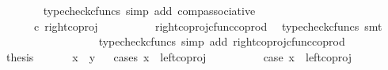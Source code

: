 \begin{isabellebody}
\ \ \ \ \ \ \isamarkupfalse%
\ {\isacharparenleft}{\kern0pt}typecheck{\isacharunderscore}{\kern0pt}cfuncs{\isacharcomma}{\kern0pt}\ simp\ add{\isacharcolon}{\kern0pt}\ comp{\isacharunderscore}{\kern0pt}associative{}{\isacharparenright}{\kern0pt}\isanewline
\ \ \ \ \isamarkupfalse%
\ \isamarkupfalse%
\ {\isachardoublequoteopen}{\isachardot}{\kern0pt}{\isachardot}{\kern0pt}{\isachardot}{\kern0pt}\ {\isacharequal}{\kern0pt}\ {\isasymlangle}{\isasymt}{\isacharcomma}{\kern0pt}{\isasymf}{\isasymrangle}\ {\isasymamalg}\ {\isasymlangle}{\isasymf}{\isacharcomma}{\kern0pt}{\isasymt}{\isasymrangle}\ {\isasymcirc}\isactrlsub c\ right{\isacharunderscore}{\kern0pt}coproj\ {\isasymone}\ {\isasymone}{\isachardoublequoteclose}\isanewline
\ \ \ \ \ \ \isamarkupfalse%
\ right{\isacharunderscore}{\kern0pt}coproj{\isacharunderscore}{\kern0pt}cfunc{\isacharunderscore}{\kern0pt}coprod\ \isamarkupfalse%
\ {\isacharparenleft}{\kern0pt}typecheck{\isacharunderscore}{\kern0pt}cfuncs{\isacharcomma}{\kern0pt}\ smt{\isacharparenright}{\kern0pt}\isanewline
\ \ \ \ \isamarkupfalse%
\ \isamarkupfalse%
\ {\isachardoublequoteopen}{\isachardot}{\kern0pt}{\isachardot}{\kern0pt}{\isachardot}{\kern0pt}\ {\isacharequal}{\kern0pt}\ {\isasymlangle}{\isasymf}{\isacharcomma}{\kern0pt}{\isasymt}{\isasymrangle}{\isachardoublequoteclose}\isanewline
\ \ \ \ \ \ \isamarkupfalse%
\ {\isacharparenleft}{\kern0pt}typecheck{\isacharunderscore}{\kern0pt}cfuncs{\isacharcomma}{\kern0pt}\ simp\ add{\isacharcolon}{\kern0pt}\ right{\isacharunderscore}{\kern0pt}coproj{\isacharunderscore}{\kern0pt}cfunc{\isacharunderscore}{\kern0pt}coprod{\isacharparenright}{\kern0pt}\isanewline
\ \ \ \ \isamarkupfalse%
\ \isamarkupfalse%
\ {\isacharquery}{\kern0pt}thesis\isacommand{{\isachardot}{\kern0pt}}\isamarkupfalse%
\isanewline
\ \ \isamarkupfalse%
\isanewline
\ \ \isamarkupfalse%
\ {\isachardoublequoteopen}x\ {\isacharequal}{\kern0pt}\ y{\isachardoublequoteclose}\isanewline
\ \ \isamarkupfalse%
{\isacharparenleft}{\kern0pt}cases\ {\isachardoublequoteopen}x\ {\isacharequal}{\kern0pt}\ left{\isacharunderscore}{\kern0pt}coproj\ {\isasymone}\ {\isacharparenleft}{\kern0pt}{\isasymone}\ {\isasymCoprod}\ {\isasymone}{\isacharparenright}{\kern0pt}{\isachardoublequoteclose}{\isacharparenright}{\kern0pt}\isanewline
\ \ \ \ \isamarkupfalse%
\ case{}{\isacharcolon}{\kern0pt}\ {\isachardoublequoteopen}x\ {\isacharequal}{\kern0pt}\ left{\isacharunderscore}{\kern0pt}coproj\ {\isasymone}\ {\isacharparenleft}{\kern0pt}{\isasymone}\ {\isasymCoprod}\ {\isasymone}{\isacharparenright}{\kern0pt}{\isachardoublequoteclose}\isanewline

\end{isabellebody}
